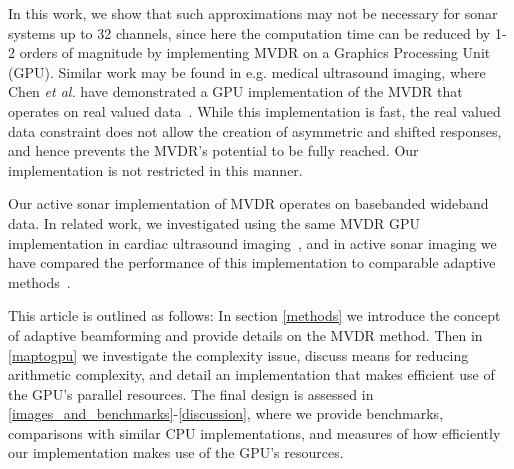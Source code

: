 \documentclass[12pt,journal,draftclsnofoot,onecolumn]{IEEEtran}
\newcommand\1{\vec 1}
\begin{document}
% 
% 


In this work, we show that such approximations may not be necessary for sonar systems up to 32 channels, since here the computation time can be reduced by 1-2 orders of magnitude by implementing MVDR on a Graphics Processing Unit (GPU). Similar work may be found in e.g. medical ultrasound imaging, where Chen \emph{et al.} have demonstrated a GPU implementation of the MVDR that operates on real valued data~\cite{Chen2011,Chen2011a}. While this implementation is fast, the real valued data constraint does not allow the creation of asymmetric and shifted responses, and hence prevents the MVDR's potential to be fully reached. Our implementation is not restricted in this manner.

Our active sonar implementation of MVDR operates on basebanded wideband data. In related work, we investigated using the same MVDR GPU implementation in cardiac ultrasound imaging~\cite{Asen2012,Asen2013}, and in active sonar imaging we have compared the performance of this implementation to comparable adaptive methods~\cite{Buskenes2013a}.

This article is outlined as follows: In section \ref{methods} we introduce the concept of adaptive beamforming and provide details on the MVDR method. Then in \ref{maptogpu} we investigate the complexity issue, discuss means for reducing arithmetic complexity, and detail an implementation that makes efficient use of the GPU's parallel resources. The final design is assessed in \ref{images_and_benchmarks}-\ref{discussion}, where we provide benchmarks, comparisons with similar CPU implementations, and measures of how efficiently our implementation makes use of the GPU's resources.

\end{document}
